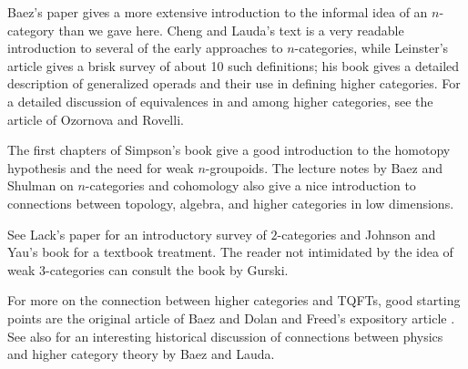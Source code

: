\documentclass[a4paper,11pt]{article}
\begin{document}
Baez's paper \cite{BaezNcat} gives a more extensive introduction to
the informal idea of an $n$-category than we gave here. Cheng and
Lauda's text \cite{ChengLauda} is a very readable introduction to
several of the early approaches to $n$-categories, while Leinster's
article \cite{LeinsterSurvey} gives a brisk survey of about 10 such
definitions; his book \cite{LeinsterBook} gives a detailed
description of generalized operads and their use in defining higher categories. For a detailed discussion of equivalences in and among
higher categories, see the article \cite{ORequiv} of Ozornova and
Rovelli.

The first chapters of Simpson's book \cite{Simpson} give a good
introduction to the homotopy hypothesis and the need for weak
$n$-groupoids. The lecture notes \cite{BaezShulman} by Baez and
Shulman on $n$-categories and cohomology also give a nice introduction
to connections between topology, algebra, and higher categories in low
dimensions.

See Lack's paper \cite{Lack} for an introductory survey of
$2$-categories and Johnson and Yau's book \cite{JohnsonYau} for a
textbook treatment. The reader not intimidated by the idea of weak
$3$-categories can consult the book \cite{Gurski} by Gurski.

For more on the connection between higher categories and TQFTs, good
starting points are the original article \cite{BaezDolanTQFT} of Baez
and Dolan and Freed's expository article \cite{FreedCob}. See also
\cite{BaezLauda} for an interesting historical discussion of
connections between physics and higher category theory by Baez and
Lauda.
\end{document}
